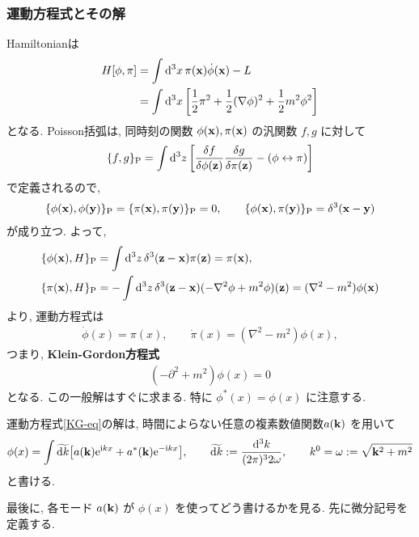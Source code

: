 \documentclass[../note01.tex]{subfiles}
\begin{document}
\subsubsection{運動方程式とその解}
Hamiltonianは
\begin{align}
    H[\phi,\pi] &= \int\dd[3]{x} \pi(\vb{x})\dot{\phi}(\vb{x}) -L \notag \\
    &= \int\dd[3]{x} \qty[\frac{1}{2}\pi^2 + \frac{1}{2}(\nabla\phi)^2 + \frac{1}{2}m^2\phi^2]
\end{align}
となる. Poisson括弧は, 同時刻の関数 $ \phi(\vb{x}),\pi(\vb{x}) $ の汎関数 $ f,g $ に対して
\begin{align}
    \{f,g\}_\mathrm{P} = \int\dd[3]{z} \qty[\fdv{f}{\phi(\vb{z})}\fdv{g}{\pi(\vb{z})} - (\phi\leftrightarrow\pi)]
\end{align}
で定義されるので,
\begin{align}\label{Poisson_bracket}
    \{\phi(\vb{x}),\phi(\vb{y})\}_\mathrm{P} = \{\pi(\vb{x}),\pi(\vb{y})\}_\mathrm{P} = 0, \qquad
    \{\phi(\vb{x}),\pi(\vb{y})\}_\mathrm{P} = \delta^3(\vb{x}-\vb{y})
\end{align}
が成り立つ. よって,
\begin{align*}
    \{\phi(\vb{x}),H\}_\mathrm{P} &= \int\dd[3]{z} \delta^3(\vb{z}-\vb{x})\pi(\vb{z}) = \pi(\vb{x}), \\
    \{\pi(\vb{x}),H\}_\mathrm{P} &= -\int\dd[3]{z} \delta^3(\vb{z}-\vb{x})(-\nabla^2\phi + m^2\phi)(\vb{z}) = (\nabla^2-m^2)\phi(\vb{x})
\end{align*}
より, 運動方程式は
\begin{align}
    \dot{\phi}(x)=\pi(x), \qquad \dot{\pi}(x)=(\nabla^2-m^2)\phi(x),
\end{align}
つまり, \textbf{Klein-Gordon方程式}
\begin{align}\label{KG-eq}
    (-\partial^2+m^2)\phi(x)=0
\end{align}
となる. この一般解はすぐに求まる. 特に $ \phi^*(x)=\phi(x) $ に注意する.
\begin{katei}
    運動方程式\eqref{KG-eq}の解は, 時間によらない任意の複素数値関数$ a(\vb{k}) $ を用いて
    \begin{align}
        \phi(x) = \int\widetilde{\dd{k}} \qty[a(\vb{k})\mathrm{e}^{\mathrm{i} kx} + a^*(\vb{k})\mathrm{e}^{-\mathrm{i} kx}], \qquad
        \widetilde{\dd{k}} := \frac{\dd[3]{k}}{(2\pi)^3 2\omega}, \qquad
        k^0 = \omega := \sqrt{\vb{k}^2+m^2}
    \end{align}
    と書ける.
\end{katei}
最後に, 各モード $ a(\vb{k}) $ が $ \phi(x) $ を使ってどう書けるかを見る. 先に微分記号を定義する.
\end{document}

